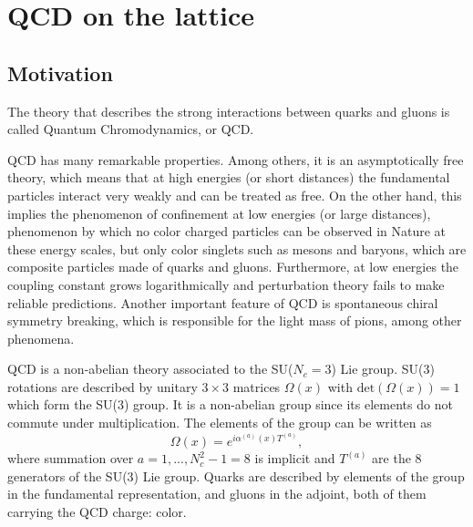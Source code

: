 \chapter{QCD on the lattice}


\label{ch_foundation}


\section{Motivation}
\label{ch_foundation:sec:general}

The theory that describes the strong interactions between quarks and gluons is called Quantum Chromodynamics, or QCD. 

QCD has many remarkable properties. Among others, it is an asymptotically free theory, which means that at high energies (or short distances) the fundamental particles interact very weakly and can be treated as free. On the other hand, this implies the phenomenon of confinement at low energies (or large distances), phenomenon by which no color charged particles can be observed in Nature at these energy scales, but only color singlets such as mesons and baryons, which are composite particles made of quarks and gluons. Furthermore, at low energies the coupling constant grows logarithmically and perturbation theory fails to make reliable predictions. Another important feature of QCD is spontaneous chiral symmetry breaking, which is responsible for the light mass of pions, among other phenomena.

QCD is a non-abelian theory associated to the SU($N_c=3$) Lie group. SU(3) rotations are described by unitary $3\times 3$ matrices $\Omega(x)$ with ${\textrm{det}}\left(\Omega(x)\right)=1$ which form the SU(3) group. It is a non-abelian group since its elements do not commute under multiplication. The elements of the group can be written as
\begin{equation}
\Omega(x)=e^{i\alpha^{(a)}(x)T^{(a)}},
\end{equation}
where summation over $a=1,...,N_c^2-1=8$ is implicit and $T^{(a)}$ are the 8 generators of the SU(3) Lie group. Quarks are described by elements of the group in the fundamental representation, and gluons in the adjoint, both of them carrying the QCD charge: color.

